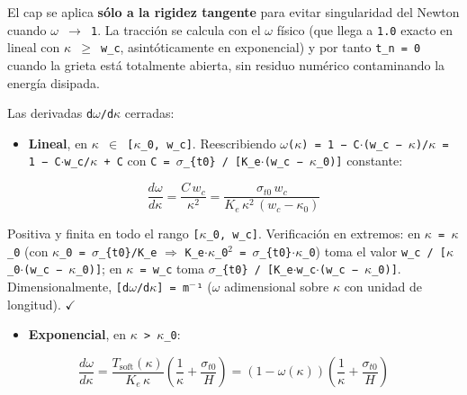 \documentclass[11pt,letterpaper,oneside]{report}
\begin{document}
El cap se aplica \textbf{sólo a la rigidez tangente} para evitar singularidad del Newton cuando \texttt{\ensuremath{\omega} \ensuremath{\to} 1}. La tracción se calcula con el \texttt{\ensuremath{\omega}} físico (que llega a \texttt{1.0} exacto en lineal con \texttt{\ensuremath{\kappa} \ensuremath{\ge} w\_c}, asintóticamente en exponencial) y por tanto \texttt{t\_n = 0} cuando la grieta está totalmente abierta, sin residuo numérico contaminando la energía disipada.

Las derivadas \texttt{d\ensuremath{\omega}/d\ensuremath{\kappa}} cerradas:

\begin{itemize}
  \item \textbf{Lineal}, en \texttt{\ensuremath{\kappa} \ensuremath{\in} [\ensuremath{\kappa}\_0, w\_c]}. Reescribiendo \texttt{\ensuremath{\omega}(\ensuremath{\kappa}) = 1 − C\ensuremath{\cdot}(w\_c − \ensuremath{\kappa})/\ensuremath{\kappa} = 1 − C\ensuremath{\cdot}w\_c/\ensuremath{\kappa} + C} con \texttt{C = \ensuremath{\sigma}\_\{t0\} / [K\_e\ensuremath{\cdot}(w\_c − \ensuremath{\kappa}\_0)]} constante:
\end{itemize}

  \[
\frac{d\omega}{d\kappa} = \frac{C\,w_c}{\kappa^2} = \frac{\sigma_{t0}\,w_c}{K_e\,\kappa^2\,(w_c - \kappa_0)}
\]

  Positiva y finita en todo el rango \texttt{[\ensuremath{\kappa}\_0, w\_c]}. Verificación en extremos: en \texttt{\ensuremath{\kappa} = \ensuremath{\kappa}\_0} (con \texttt{\ensuremath{\kappa}\_0 = \ensuremath{\sigma}\_\{t0\}/K\_e} \ensuremath{\Rightarrow} \texttt{K\_e\ensuremath{\cdot}\ensuremath{\kappa}\_0\ensuremath{^{2}} = \ensuremath{\sigma}\_\{t0\}\ensuremath{\cdot}\ensuremath{\kappa}\_0}) toma el valor \texttt{w\_c / [\ensuremath{\kappa}\_0\ensuremath{\cdot}(w\_c − \ensuremath{\kappa}\_0)]}; en \texttt{\ensuremath{\kappa} = w\_c} toma \texttt{\ensuremath{\sigma}\_\{t0\} / [K\_e\ensuremath{\cdot}w\_c\ensuremath{\cdot}(w\_c − \ensuremath{\kappa}\_0)]}. Dimensionalmente, \texttt{[d\ensuremath{\omega}/d\ensuremath{\kappa}] = m\ensuremath{^{-}}¹} (\ensuremath{\omega} adimensional sobre \ensuremath{\kappa} con unidad de longitud). \ensuremath{\checkmark}

\begin{itemize}
  \item \textbf{Exponencial}, en \texttt{\ensuremath{\kappa} > \ensuremath{\kappa}\_0}:
\end{itemize}
  \[
\frac{d\omega}{d\kappa} = \frac{T_\text{soft}(\kappa)}{K_e\,\kappa}\left(\frac{1}{\kappa} + \frac{\sigma_{t0}}{H}\right) = (1 - \omega(\kappa))\left(\frac{1}{\kappa} + \frac{\sigma_{t0}}{H}\right)
\]
\end{document}
